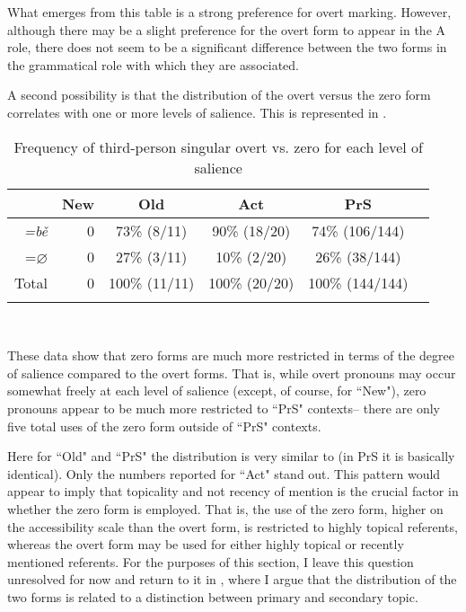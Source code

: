 What emerges from this table is a strong preference for overt marking. However, although there may be a slight preference for the overt form to appear in the A role, there does not seem to be a significant difference between the two forms in the grammatical role with which they are associated.

A second possibility is that the distribution of the overt versus the zero form correlates with one or more levels of salience. This is represented in .

\begin{table}

\caption{{Frequency of third-person singular overt vs. zero for each level of salience}}
\begin{tabular}{ r   r  c  c  c  c }
\lsptoprule
 & New & Old & Act & PrS \\

\midrule
\textit{=b\v{e}} & 0 & 73{\%} (8/11) & 90{\%} (18/20) & 74{\%} (106/144) \\

\textsc{=$\varnothing$} & 0 & 27{\%} (3/11) & 10{\%} (2/20) & 26{\%} (38/144) \\

\midrule
Total& 0 & 100{\%} (11/11) & 100{\%} (20/20) & 100{\%} (144/144)  \\

\lspbottomrule
\end{tabular}\\
\label{overtvszerovsgiven}

\end{table}

These data show that zero forms are much more restricted in terms of the degree of salience compared to the overt forms. That is, while overt pronouns may occur somewhat freely at each level of salience (except, of course, for ``New"), zero pronouns appear to be much more restricted to ``PrS" contexts-- there are only five total uses of the zero form outside of ``PrS" contexts.

Here for ``Old" and ``PrS" the distribution is very similar to  (in PrS it is basically identical). Only the numbers reported for ``Act" stand out. This pattern would appear to imply that topicality and not recency of mention is the crucial factor in whether the zero form is employed. That is, the use of the zero form, higher on the accessibility scale than the overt form, is restricted to highly topical referents, whereas the overt form may be used for either highly topical or recently mentioned referents. For the purposes of this section, I leave this question unresolved for now and return to it in , where I argue that the distribution of the two forms is related to a distinction between primary and secondary topic. 
 

